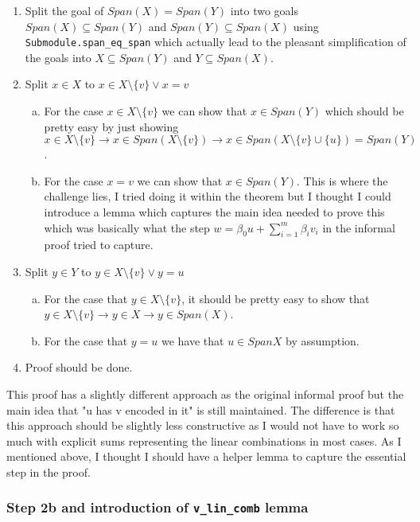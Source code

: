\documentclass{article}
\begin{document}
\begin{enumerate}
    \item Split the goal of \(Span(X) = Span(Y)\) into two goals \(Span(X) \subseteq Span(Y)\) and \(Span(Y) \subseteq Span(X)\) using \texttt{Submodule.span\_eq\_span} which actually lead to the pleasant simplification of the goals into \(X \subseteq Span(Y)\) and \(Y \subseteq Span(X)\).
    \item Split \(x \in X\) to \(x\in X \setminus \{v\} \lor x = v\)
    \begin{enumerate}[a.]
        \item For the case \(x\in X \setminus \{v\} \) we can show that \(x \in Span(Y)\) which should be pretty easy by just showing \(x \in X \setminus \{v\} \to x \in Span (X \setminus\{v\}) \to x \in Span (X \setminus\{v\} \cup \{u\}) = Span(Y)\).
        \item For the case \(x = v \) we can show that \(x \in Span(Y)\). This is where the challenge lies, I tried doing it within the theorem but I thought I could introduce a lemma which captures the main idea needed to prove this which was basically what the step \(w = \beta_0 u + \sum_{i=1}^m \beta_i v_i\) in the informal proof tried to capture.
    \end{enumerate}
    \item Split \(y \in Y\) to \(y\in X \setminus \{v\} \lor y = u\)
    \begin{enumerate}[a.]
        \item For the case that \(y\in X \setminus \{v\}\), it should be pretty easy to show that \(y\in X \setminus \{v\} \to y \in X \to y \in Span (X)\).
        \item For the case that \(y = u\) we have that \(u \in Span X\) by assumption.
    \end{enumerate}
    \item Proof should be done.
\end{enumerate}

This proof has a slightly different approach as the original informal proof but the main idea that "u has v encoded in it" is still maintained. The difference is that this approach should be slightly less constructive as I would not have to work so much with explicit sums representing the linear combinations in most cases. As I mentioned above, I thought I should have a helper lemma to capture the essential step in the proof.

\subsubsection{Step 2b and introduction of \texttt{v\_lin\_comb} lemma}
\end{document}
